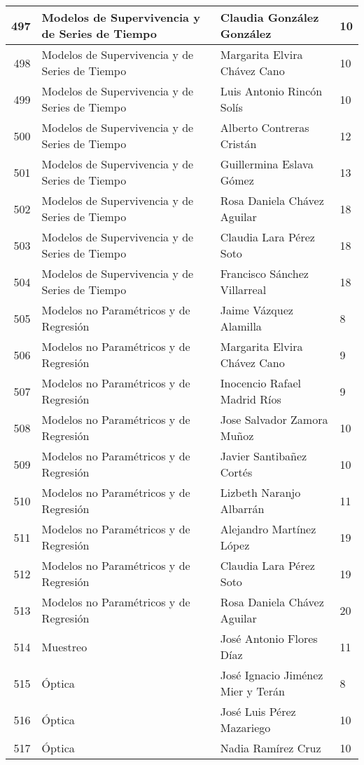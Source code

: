 \begin{table}[ht]
\begin{tabular}{rlll}
  497 & Modelos de Supervivencia y de Series de Tiempo & Claudia González González & 10 \\ \hline
  498 & Modelos de Supervivencia y de Series de Tiempo & Margarita Elvira Chávez Cano & 10 \\ \hline
  499 & Modelos de Supervivencia y de Series de Tiempo & Luis Antonio Rincón Solís & 10 \\ \hline
  500 & Modelos de Supervivencia y de Series de Tiempo & Alberto Contreras Cristán & 12 \\ \hline
  501 & Modelos de Supervivencia y de Series de Tiempo & Guillermina Eslava Gómez & 13 \\ \hline
  502 & Modelos de Supervivencia y de Series de Tiempo & Rosa Daniela Chávez Aguilar & 18 \\ \hline
  503 & Modelos de Supervivencia y de Series de Tiempo & Claudia Lara Pérez Soto & 18 \\ \hline
  504 & Modelos de Supervivencia y de Series de Tiempo & Francisco Sánchez Villarreal & 18 \\ \hline
  505 & Modelos no Paramétricos y de Regresión & Jaime Vázquez Alamilla & 8 \\ \hline
  506 & Modelos no Paramétricos y de Regresión & Margarita Elvira Chávez Cano & 9 \\ \hline
  507 & Modelos no Paramétricos y de Regresión & Inocencio Rafael Madrid Ríos & 9 \\ \hline
  508 & Modelos no Paramétricos y de Regresión & Jose Salvador Zamora Muñoz & 10 \\ \hline
  509 & Modelos no Paramétricos y de Regresión & Javier Santibañez Cortés & 10 \\ \hline
  510 & Modelos no Paramétricos y de Regresión & Lizbeth Naranjo Albarrán & 11 \\ \hline
  511 & Modelos no Paramétricos y de Regresión & Alejandro Martínez López & 19 \\ \hline
  512 & Modelos no Paramétricos y de Regresión & Claudia Lara Pérez Soto & 19 \\ \hline
  513 & Modelos no Paramétricos y de Regresión & Rosa Daniela Chávez Aguilar & 20 \\ \hline
  514 & Muestreo & José Antonio Flores Díaz & 11 \\ \hline
  515 & Óptica & José Ignacio Jiménez Mier y Terán & 8 \\ \hline
  516 & Óptica & José Luis Pérez Mazariego & 10 \\ \hline
  517 & Óptica & Nadia Ramírez Cruz & 10 \\ \hline

\end{tabular}
\end{table}
